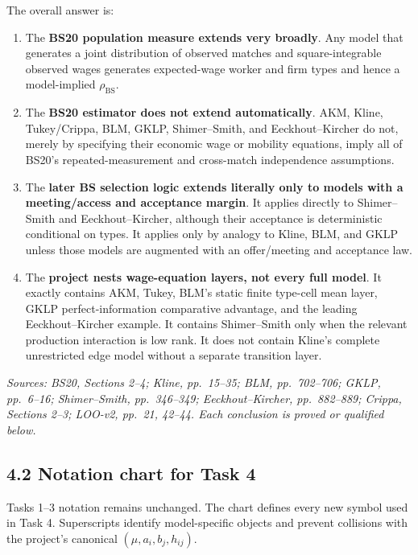 \documentclass[11pt]{article}
\begin{document}
The overall answer is:

\begin{enumerate}
\item The \textbf{BS20 population measure extends very broadly}.  Any model
  that generates a joint distribution of observed matches and square-integrable
  observed wages generates expected-wage worker and firm types and hence a
  model-implied \(\rho_{\mathrm{BS}}\).
\item The \textbf{BS20 estimator does not extend automatically}.  AKM, Kline,
  Tukey/Crippa, BLM, GKLP, Shimer--Smith, and Eeckhout--Kircher do not, merely
  by specifying their economic wage or mobility equations, imply all of
  BS20's repeated-measurement and cross-match independence assumptions.
\item The \textbf{later BS selection logic extends literally only to models
  with a meeting/access and acceptance margin}.  It applies directly to
  Shimer--Smith and Eeckhout--Kircher, although their acceptance is
  deterministic conditional on types.  It applies only by analogy to Kline,
  BLM, and GKLP unless those models are augmented with an offer/meeting and
  acceptance law.
\item The \textbf{project nests wage-equation layers, not every full model}.
  It exactly contains AKM, Tukey, BLM's static finite type-cell mean layer,
  GKLP perfect-information comparative advantage, and the leading
  Eeckhout--Kircher example.  It contains Shimer--Smith only when the relevant
  production interaction is low rank.  It does not contain Kline's complete
  unrestricted edge model without a separate transition layer.
\end{enumerate}

\textit{Sources: BS20, Sections 2--4; Kline, pp.\ 15--35; BLM,
pp.\ 702--706; GKLP, pp.\ 6--16; Shimer--Smith, pp.\ 346--349;
Eeckhout--Kircher, pp.\ 882--889; Crippa, Sections 2--3; LOO-v2,
pp.\ 21, 42--44.  Each conclusion is proved or qualified below.}

\subsection{4.2 Notation chart for Task 4}

Tasks 1--3 notation remains unchanged.  The chart defines every new symbol
used in Task 4.  Superscripts identify model-specific objects and prevent
collisions with the project's canonical \((\mu,a_i,b_j,h_{ij})\).
\end{document}
